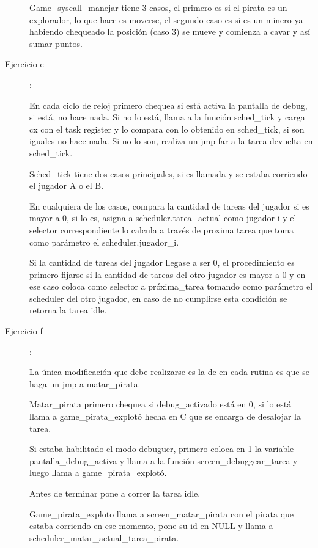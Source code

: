 \documentclass[a4paper]{article}
\begin{document}
\begin{description}
  Game_syscall_manejar tiene 3 casos, el primero es si el pirata es un explorador, lo que hace es moverse, el segundo caso es si es un minero ya habiendo chequeado la posición (caso 3) se mueve y comienza a cavar y así sumar puntos.
  
  
      
  \item[Ejercicio e] :\newline
  
  En cada ciclo de reloj primero chequea si está activa la pantalla de debug, si está, no hace nada. Si no lo está, llama a la función sched_tick y carga cx con el task register y lo compara con lo obtenido en sched_tick, si son iguales no hace nada. Si no lo son, realiza un jmp far a la tarea devuelta en sched_tick.
  
  Sched_tick tiene dos casos principales, si es llamada y se estaba corriendo el jugador A o el B.
  
  En cualquiera de los casos, compara la cantidad de tareas del jugador si es mayor a 0, si lo es, asigna a scheduler.tarea_actual como jugador i y el selector correspondiente lo calcula a través de proxima tarea que toma como parámetro el scheduler.jugador_i.
  
  Si la cantidad de tareas del jugador llegase a ser 0, el procedimiento es primero fijarse si la cantidad de tareas del otro jugador es mayor a 0 y en ese caso coloca como selector a próxima_tarea tomando como parámetro el scheduler del otro jugador, en caso de no cumplirse esta condición se retorna la tarea idle.
  
  
  
  \item[Ejercicio f] :\newline
  
    La única modificación que debe realizarse es la de en cada rutina es que se haga un jmp a matar_pirata.
    
    Matar_pirata primero chequea si debug_activado está en 0, si lo está llama a game_pirata_explotó hecha en C que se encarga de desalojar la tarea.
    
    Si estaba habilitado el modo debuguer, primero coloca en 1 la variable pantalla_debug_activa y llama a la función screen_debuggear_tarea y luego llama a game_pirata_explotó.
    
    Antes de terminar pone a correr la tarea idle.
    
    Game_pirata_exploto llama a screen_matar_pirata con el pirata que estaba corriendo en ese momento, pone su id en NULL y llama a scheduler_matar_actual_tarea_pirata.
  

\end{description}
\end{document}
